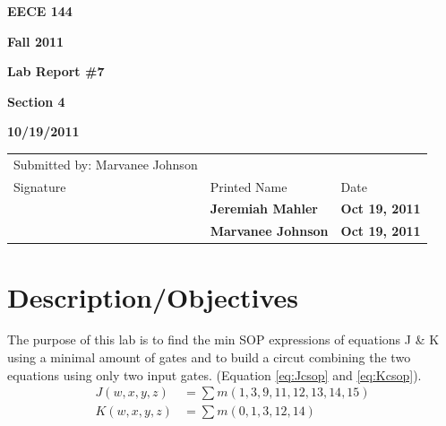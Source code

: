 \documentclass[12pt]{article}
\begin{document}
\centerline{\bf EECE 144}
\centerline{\bf Fall 2011}
\centerline{\bf}
\centerline{\bf Lab Report \#7}
\centerline{\bf Section 4}
\centerline{\bf 10/19/2011}
\begin{center}
\begin{tabularx}{\textwidth}[b]{X l l}
Submitted by: Marvanee Johnson & & \\
Signature & Printed Name & Date \\
\hline
\multicolumn{1}{|X|}{} & \multicolumn{1}{|l|}{\bigstrut \bf Jeremiah Mahler} & \multicolumn{1}{|l|}{\bf Oct 19, 2011} \\
\hline
\multicolumn{1}{|X|}{} & \multicolumn{1}{|l|}{\bigstrut \bf Marvanee Johnson} & \multicolumn{1}{|l|}{\bf Oct 19, 2011} \\
\hline
\end{tabularx}
\end{center}

\section{Description/Objectives}
The purpose of this lab is to find the min SOP expressions of equations J \& K using a minimal amount of gates and to build a circut combining the two equations using only two input gates.
(Equation \ref{eq:Jcsop} and \ref{eq:Kcsop}).
\begin{align}
J(w, x, y, z) &= \sum m(1,3,9,11,12,13,14,15) \label{eq:Jcsop} \\
K(w, x, y, z) &= \sum m(0,1,3,12,14) \label{eq:Kcsop}
\end{align}
\end{document}
